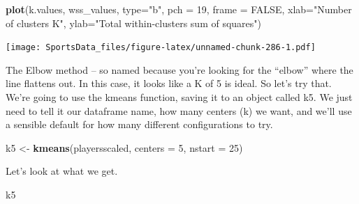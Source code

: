 \documentclass[]{book}
\newenvironment{Shaded}{\begin{snugshade}}{\end{snugshade}}
\newcommand{\DataTypeTok}[1]{\textcolor[rgb]{0.13,0.29,0.53}{#1}}
\newcommand{\DecValTok}[1]{\textcolor[rgb]{0.00,0.00,0.81}{#1}}
\newcommand{\KeywordTok}[1]{\textcolor[rgb]{0.13,0.29,0.53}{\textbf{#1}}}
\newcommand{\NormalTok}[1]{#1}
\newcommand{\OtherTok}[1]{\textcolor[rgb]{0.56,0.35,0.01}{#1}}
\newcommand{\StringTok}[1]{\textcolor[rgb]{0.31,0.60,0.02}{#1}}
\begin{document}
\begin{Shaded}
\begin{Highlighting}[]
\KeywordTok{plot}\NormalTok{(k.values, wss_values,}
       \DataTypeTok{type=}\StringTok{"b"}\NormalTok{, }\DataTypeTok{pch =} \DecValTok{19}\NormalTok{, }\DataTypeTok{frame =} \OtherTok{FALSE}\NormalTok{, }
       \DataTypeTok{xlab=}\StringTok{"Number of clusters K"}\NormalTok{,}
       \DataTypeTok{ylab=}\StringTok{"Total within-clusters sum of squares"}\NormalTok{)}
\end{Highlighting}
\end{Shaded}

\texttt{[image: SportsData\_files/figure-latex/unnamed-chunk-286-1.pdf]}

The Elbow method -- so named because you're looking for the ``elbow'' where the line flattens out. In this case, it looks like a K of 5 is ideal. So let's try that. We're going to use the kmeans function, saving it to an object called k5. We just need to tell it our dataframe name, how many centers (k) we want, and we'll use a sensible default for how many different configurations to try.

\begin{Shaded}
\begin{Highlighting}[]
\NormalTok{k5 <-}\StringTok{ }\KeywordTok{kmeans}\NormalTok{(playersscaled, }\DataTypeTok{centers =} \DecValTok{5}\NormalTok{, }\DataTypeTok{nstart =} \DecValTok{25}\NormalTok{)}
\end{Highlighting}
\end{Shaded}

Let's look at what we get.

\begin{Shaded}
\begin{Highlighting}[]
\NormalTok{k5}
\end{Highlighting}
\end{Shaded}
\end{document}
